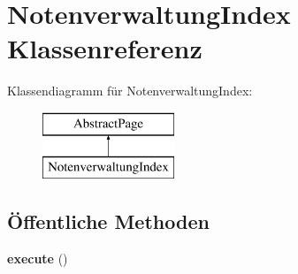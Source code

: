 \hypertarget{class_notenverwaltung_index}{}\section{Notenverwaltung\+Index Klassenreferenz}
\label{class_notenverwaltung_index}
Klassendiagramm für Notenverwaltung\+Index\+:\begin{figure}[H]
\begin{center}
\leavevmode
\includegraphics[height=2.000000cm]{class_notenverwaltung_index}
\end{center}
\end{figure}
\subsection*{Öffentliche Methoden}
\begin{DoxyCompactItemize}
\item 
\mbox{\label{class_notenverwaltung_index_a58092c82967fa0f68223b9cb0bbef2e8}} 
{\bfseries execute} ()
\end{DoxyCompactItemize}
